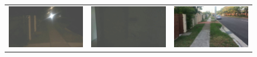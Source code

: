 \documentclass[letterpaper, 10 pt, conference]{ieeeconf}  %
\begin{document}
\begin{figure}[htbp]
\begin{tabular}{ccc}
 \includegraphics[width=\imgW,height=\imgH]{rio-q2-2} &
 \includegraphics[width=\imgW,height=\imgH]{rio-rf2-2} &
 \includegraphics[width=\imgW,height=\imgH]{rio-r2} \\
 

\end{tabular}
\end{figure}
\end{document}
